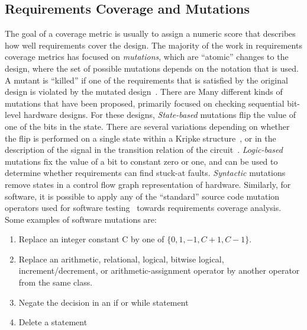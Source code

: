 


\subsection{Requirements Coverage and Mutations}
The goal of a coverage metric is usually to assign a numeric score that describes how well requirements cover the design.  The majority of the work in requirements coverage metrics has focused on {\em mutations}, which are ``atomic'' changes to the design, where the set of possible mutations depends on the notation that is used.  A mutant is ``killed'' if one of the requirements that is satisfied by the original design is violated by the mutated design~\cite{chockler_coverage_2003,chockler2001practical,chockler2010coverage,Kupferman:2006:SCF,kupferman_theory_2008}.  There are Many different kinds of mutations that have been proposed, primarily focused on checking sequential bit-level hardware designs.  For these designs, {\em State-based} mutations flip the value of one of the bits in the state.  There are several variations depending on whether the flip is performed on a single state within a Kripke structure~\cite{hoskote1999coverage}, or in the description of the signal in the transition relation of the circuit~\cite{chockler2001practical}.  {\em Logic-based} mutations fix the value of a bit to constant zero or one, and can be used to determine whether requirements can find stuck-at faults.  {\em Syntactic} mutations~\cite{chockler_coverage_2003} remove states in a control flow graph representation of hardware.  Similarly, for software, it is possible to apply any of the ``standard'' source code mutation operators used for software testing~\cite{Andrews06:mutation} towards requirements coverage analysis.  Some examples of software mutations are:
\begin{enumerate}
    \item Replace an integer constant C by one of $\{0, 1, -1, C + 1, C - 1\}$.
    \item Replace an arithmetic, relational, logical, bitwise logical, increment/decrement, or arithmetic-assignment operator by another operator from the same class.
    \item Negate the decision in an if or while statement
    \item Delete a statement
\end{enumerate}


